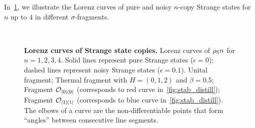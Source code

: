 \documentclass[pra,
aps,
twocolumn,
superscriptaddress,
groupedaddress,
nofootinbib,
reprint
]{revtex4-1}
\begin{document}
In~\cref{fig:lcs}, we illustrate the Lorenz curves of pure and noisy $n$-copy Strange states for $n$ up to $4$ in different $\sigma$-fragments.
\begin{figure}%
    \centering
    \hspace{1pt}%
    \\
    \hspace{1pt}%
    \caption{\textbf{Lorenz curves of Strange state copies.} Lorenz curves of $\rho_{\rm{S}}n$ for $n=1,2,3,4$.
    Solid lines represent pure Strange states ($\epsilon = 0$); dashed lines represent noisy Strange states ($\epsilon = 0.1$).
     Unital fragment;  Thermal fragment with $H = (0,1,2)$ and $\beta = 0.5$;  Fragment $\mathcal{O}_{\ketbra{0}{0}}$ (corresponds to red curve in~\cref{fig:stab_distill});  Fragment $\mathcal{O}_{\ketbra{1}{1}}$ (corresponds to blue curve in~\cref{fig:stab_distill}).
    The elbows of a curve are the non-differentiable points that form ``angles'' between consecutive line segments.
    }%
    \label{fig:lcs}
\end{figure}
\end{document}
